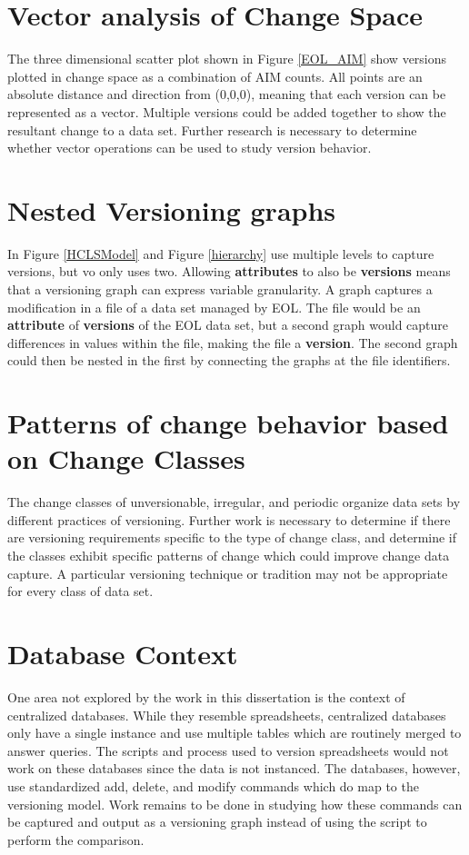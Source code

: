 \section{Vector analysis of Change Space}

The three dimensional scatter plot shown in Figure \ref{EOL_AIM} show versions plotted in change space as a combination of \gls{AIM} counts.
All points are an absolute distance and direction from (0,0,0), meaning that each version can be represented as a vector.
Multiple versions could be added together to show the resultant change to a data set.
Further research is necessary to determine whether vector operations can be used to study version behavior.

\section{Nested Versioning graphs}

In Figure \ref{HCLSModel} and Figure \ref{hierarchy} use multiple levels to capture versions, but \gls{vo} only uses two.
Allowing \textbf{attributes} to also be \textbf{versions} means that a versioning graph can express variable granularity.
A graph captures a modification in a file of a data set managed by EOL.
The file would be an \textbf{attribute} of \textbf{versions} of the EOL data set, but a second graph would capture differences in values within the file, making the file a \textbf{version}.
The second graph could then be nested in the first by connecting the graphs at the file identifiers.

\section{Patterns of change behavior based on Change Classes}

The change classes of unversionable, irregular, and periodic organize data sets by different practices of versioning.
Further work is necessary to determine if there are versioning requirements specific to the type of change class, and determine if the classes exhibit specific patterns of change which could improve change data capture.
A particular versioning technique or tradition may not be appropriate for every class of data set.

\section{Database Context}

One area not explored by the work in this dissertation is the context of centralized databases.
While they resemble spreadsheets, centralized databases only have a single instance and use multiple tables which are routinely merged to answer queries.
The scripts and process used to version spreadsheets would not work on these databases since the data is not instanced.
The databases, however, use standardized add, delete, and modify commands which do map to the versioning model.
Work remains to be done in studying how these commands can be captured and output as a versioning graph instead of using the script to perform the comparison.


